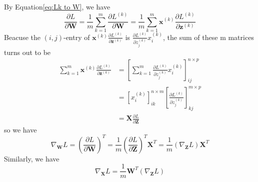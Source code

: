 \documentclass{article}
\newcommand{\Derivative}[2]{\ensuremath{\frac{\partial#1}{\partial#2}}}
\begin{document}
By {\sc Equation}\eqref{eq:Lk to W}, we have
\begin{equation}
    \Derivative{L}{\boldsymbol{W}}=\frac{1}{m}\sum_{k=1}^m \Derivative{L^{(k)}}{\boldsymbol{W}}=\frac{1}{m}\sum_{k=1}^m\boldsymbol{x}^{(k)} \Derivative{L^{(k)}}{\boldsymbol{z}^{(k)}}
\end{equation}
Beacuse the $(i,j)$-entry of $\boldsymbol{x}^{(k)} \Derivative{L^{(k)}}{\boldsymbol{z}^{(k)}}$ is $\Derivative{L^{(k)}}{z^{(k)}_j}x_i^{(k)}$, the sum of these m matrices turns out to be
\begin{equation}
    \begin{split}
        \sum_{k=1}^m\boldsymbol{x}^{(k)} \Derivative{L^{(k)}}{\boldsymbol{z}^{(k)}}
        &=\left[
            \sum_{k=1}^m \Derivative{L^{(k)}}{z^{(k)}_j}x_i^{(k)}
        \right]^{n\times p}_{ij}\\
        &=\left[
            x_i^{(k)}
        \right]^{n\times m}_{ik}\left[
            \Derivative{L^{(k)}}{z^{(k)}_j}
        \right]^{m\times p}_{kj}\\
        &=\boldsymbol{X}\Derivative{L}{\boldsymbol{Z}}
    \end{split}
\end{equation}
so we have 
\begin{equation}
    \nabla_{\boldsymbol{W}}L=\left(\Derivative{L}{\boldsymbol{W}}\right)^T=\frac{1}{m}\left(\Derivative{L}{\boldsymbol{Z}}\right)^T\boldsymbol{X}^T=\frac{1}{m}\left(\nabla_{\boldsymbol{Z}}L\right)\boldsymbol{X}^T
\end{equation}
Similarly, we have 
\begin{equation}
    \nabla_{\boldsymbol{X}}L=\frac{1}{m}\boldsymbol{W}^T\left(\nabla_{\boldsymbol{Z}}L\right)
\end{equation}
\end{document}
